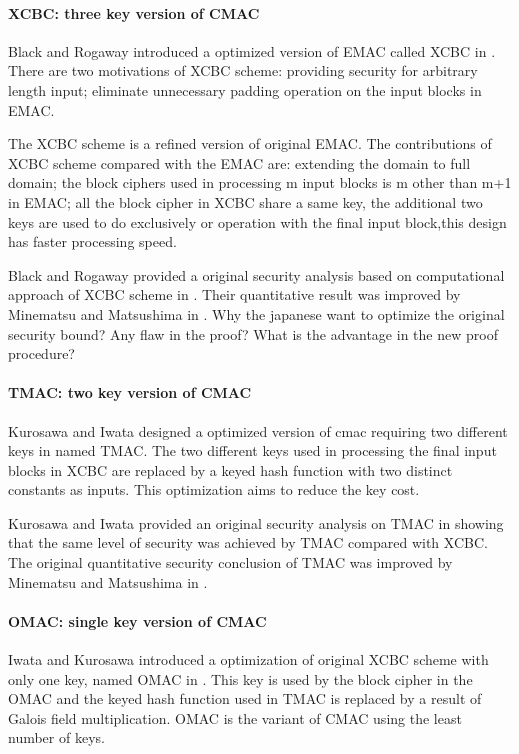 \documentclass{article}
\begin{document}
\paragraph{XCBC: three key version of CMAC }
Black and Rogaway introduced a optimized version of EMAC called XCBC in \cite{xcbc}.
There are two motivations of XCBC scheme: providing security for arbitrary length input; eliminate unnecessary padding operation on the input blocks in EMAC.

The XCBC scheme is a refined version of original EMAC. The contributions of XCBC scheme compared with the EMAC are: extending the domain to full domain; the block ciphers used in processing m input blocks is m other than m+1 in EMAC; all the block cipher in XCBC share a same key, the additional two keys are used to do exclusively or operation with the final input block,this design has faster processing speed.   

Black and Rogaway provided a original security analysis based on computational approach of XCBC scheme in \cite{xcbc}. Their quantitative result was improved by Minematsu and Matsushima in \cite{new}. 
Why the japanese want to optimize the original security bound? Any flaw in the proof? What is the advantage in the new proof procedure?
\paragraph{TMAC: two key version of CMAC}
Kurosawa and Iwata designed a optimized version of cmac requiring two different keys in \cite{tmac} named TMAC.  
The two different keys used in processing the final input blocks in XCBC are replaced by a keyed hash function with two distinct constants as inputs. This optimization aims to reduce the key cost. 

Kurosawa and Iwata provided an original security analysis on TMAC in \cite{tmac} showing that the same level of security was achieved by TMAC compared with XCBC. The original quantitative security conclusion of TMAC was improved by Minematsu and Matsushima in \cite{new}. 
\paragraph{OMAC: single key version of CMAC}
Iwata and Kurosawa introduced a optimization of original XCBC scheme with only one key, named OMAC in \cite{omac}. This key is used by the block cipher in the OMAC and the keyed hash function used in TMAC is replaced by a result of Galois field multiplication. OMAC is the variant of CMAC using the least number of keys. 
\end{document}
